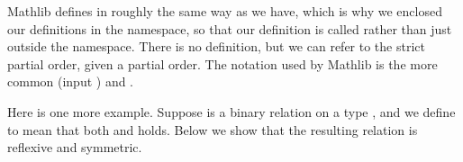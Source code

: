 \documentclass[letterpaper,10pt,english]{sphinxmanual}
\begin{document}
\sphinxAtStartPar
Mathlib defines  in roughly the same way as we have,
which is why we enclosed our definitions in the  namespace,
so that our definition is called 
rather than just  outside the namespace.
There is no  definition,
but we can refer to the strict partial order, given a partial order.
The notation used by Mathlib is the more common 
(input ) and \sphinxcode{\sphinxupquote{<}}.

\sphinxAtStartPar
Here is one more example. Suppose  is a binary relation on a type , and we define  to mean that both  and  holds. Below we show that the resulting relation is reflexive and symmetric.

\begin{sphinxVerbatim}[commandchars=\\\{\}]
   
       

    
    

             

    
  
         
         

    
   
      
       
       
      

\end{sphinxVerbatim}
\end{document}
